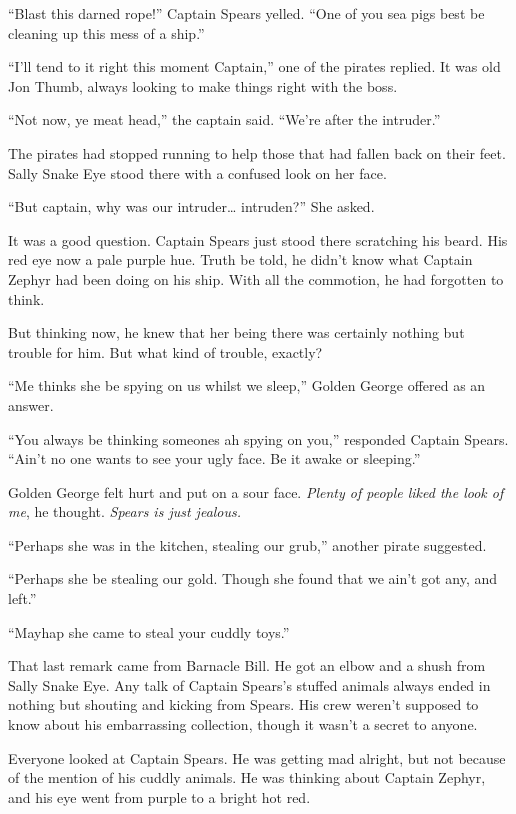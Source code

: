 \documentclass[12pt]{extbook}
\begin{document}
  \enquote{Blast this darned rope!} Captain Spears yelled. \enquote{One of
  you sea pigs best be cleaning up this mess of a ship.}
  
  \enquote{I'll tend to it right this moment Captain,} one of the pirates
  replied. It was old Jon Thumb, always looking to make things right with
  the boss.
  
  \enquote{Not now, ye meat head,} the captain said. \enquote{We're after
  the intruder.}
  
  The pirates had stopped running to help those that had fallen back on
  their feet. Sally Snake Eye stood there with a confused look on her
  face.
  
  \enquote{But captain, why was our intruder\ldots{} intruden?} She asked.
  
  It was a good question. Captain Spears just stood there scratching his
  beard. His red eye now a pale purple hue. Truth be told, he didn't know
  what Captain Zephyr had been doing on his ship. With all the commotion,
  he had forgotten to think.
  
  But thinking now, he knew that her being there was certainly nothing but
  trouble for him. But what kind of trouble, exactly?
  
  \enquote{Me thinks she be spying on us whilst we sleep,} Golden George
  offered as an answer.
  
  \enquote{You always be thinking someones ah spying on you,} responded
  Captain Spears. \enquote{Ain't no one wants to see your ugly face. Be it
  awake or sleeping.}
  
  Golden George felt hurt and put on a sour face. \emph{Plenty of people
  liked the look of me}, he thought. \emph{Spears is just jealous.}
  
  \enquote{Perhaps she was in the kitchen, stealing our grub,} another
  pirate suggested.
  
  \enquote{Perhaps she be stealing our gold. Though she found that we
  ain't got any, and left.}
  
  \enquote{Mayhap she came to steal your cuddly toys.}
  
  That last remark came from Barnacle Bill. He got an elbow and a shush
  from Sally Snake Eye. Any talk of Captain Spears's stuffed animals
  always ended in nothing but shouting and kicking from Spears. His crew
  weren't supposed to know about his embarrassing collection, though it
  wasn't a secret to anyone.
  
  Everyone looked at Captain Spears. He was getting mad alright, but not
  because of the mention of his cuddly animals. He was thinking about
  Captain Zephyr, and his eye went from purple to a bright hot red.
  
\end{document}
